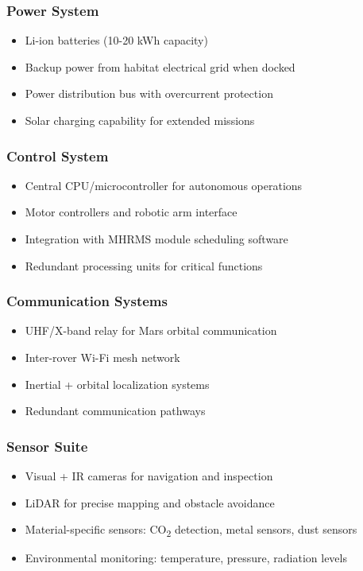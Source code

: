 \documentclass[12pt, a4paper]{article}
\begin{document}
\subsubsection{Power System}
\begin{itemize}
    \item Li-ion batteries (10-20 kWh capacity)
    \item Backup power from habitat electrical grid when docked
    \item Power distribution bus with overcurrent protection
    \item Solar charging capability for extended missions
\end{itemize}

\subsubsection{Control System}
\begin{itemize}
    \item Central CPU/microcontroller for autonomous operations
    \item Motor controllers and robotic arm interface
    \item Integration with MHRMS module scheduling software
    \item Redundant processing units for critical functions
\end{itemize}

\subsubsection{Communication Systems}
\begin{itemize}
    \item UHF/X-band relay for Mars orbital communication
    \item Inter-rover Wi-Fi mesh network
    \item Inertial + orbital localization systems
    \item Redundant communication pathways
\end{itemize}

\subsubsection{Sensor Suite}
\begin{itemize}
    \item Visual + IR cameras for navigation and inspection
    \item LiDAR for precise mapping and obstacle avoidance
    \item Material-specific sensors: CO\textsubscript{2} detection, metal sensors, dust sensors
    \item Environmental monitoring: temperature, pressure, radiation levels
\end{itemize}
\end{document}
